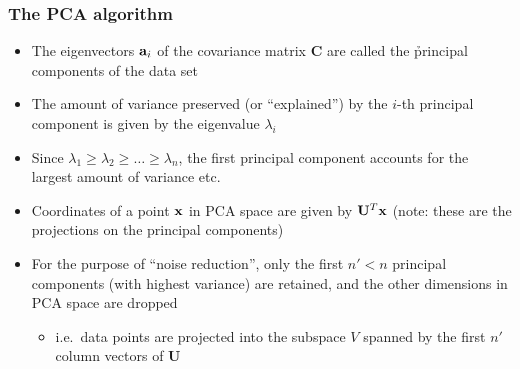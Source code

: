 \begin{frame}
  \frametitle{The PCA algorithm}

  \begin{itemize}
  \item The eigenvectors $\va_i$ of the covariance matrix $\mathbf{C}$ are
    called the \h{principal components} of the data set
  \item The amount of variance preserved (or ``explained'') by the $i$-th
    principal component is given by the eigenvalue $\lambda_i$
  \item Since $\lambda_1 \geq \lambda_2 \geq \dots \geq \lambda_n$, the first
    principal component accounts for the largest amount of variance etc.
  \item Coordinates of a point $\vx$ in PCA space are given by $\mathbf{U}^T
    \vx$ (note: these are the projections on the principal components)
  \item For the purpose of ``noise reduction'', only the first $n' < n$
    principal components (with highest variance) are retained, and the other
    dimensions in PCA space are dropped
    \begin{itemize}
    \item[\hand] i.e.\ data points are projected into the subspace $V$ spanned
      by the first $n'$ column vectors of $\mathbf{U}$
    \end{itemize}
  \end{itemize}
\end{frame}

